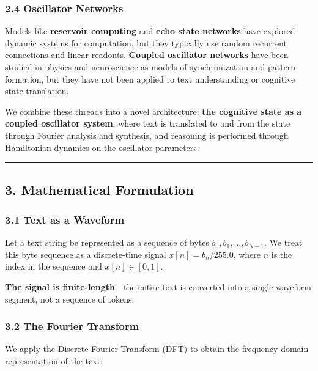 \documentclass[
  11pt,
  a4paper,
]{article}
\begin{document}
\subsubsection{2.4 Oscillator Networks}\label{oscillator-networks}

Models like \textbf{reservoir computing} and \textbf{echo state
networks} have explored dynamic systems for computation, but they
typically use random recurrent connections and linear readouts.
\textbf{Coupled oscillator networks} have been studied in physics and
neuroscience as models of synchronization and pattern formation, but
they have not been applied to text understanding or cognitive state
translation.

We combine these threads into a novel architecture: \textbf{the
cognitive state as a coupled oscillator system}, where text is
translated to and from the state through Fourier analysis and synthesis,
and reasoning is performed through Hamiltonian dynamics on the
oscillator parameters.

\begin{center}\rule{0.5\linewidth}{0.5pt}\end{center}

\subsection{3. Mathematical Formulation}\label{mathematical-formulation}

\subsubsection{3.1 Text as a Waveform}\label{text-as-a-waveform}

Let a text string be represented as a sequence of bytes
\(b_0, b_1, \dots, b_{N-1}\). We treat this byte sequence as a
discrete-time signal \(x[n] = b_n / 255.0\), where \(n\) is the index in
the sequence and \(x[n] \in [0, 1]\).

\textbf{The signal is finite-length}---the entire text is converted into
a single waveform segment, not a sequence of tokens.

\subsubsection{3.2 The Fourier Transform}\label{the-fourier-transform}

We apply the Discrete Fourier Transform (DFT) to obtain the
frequency-domain representation of the text:
\end{document}
